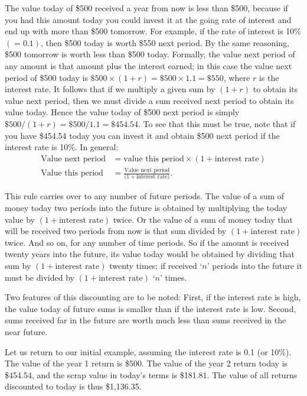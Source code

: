 The value today of \$500 received a year from now is less than \$500,
because if you had this amount today you could invest it at the going rate
of interest and end up with more than \$500 tomorrow. For example, if the
rate of interest is 10\% $(= 0.1)$, then \$500 today is worth \$550 next
period. By the same reasoning, \$500 tomorrow is worth less than \$500
today.  Formally, the value next period of any amount is that amount plus
the interest earned; in this case the value next period of \$500 today is 
$\$500\times (1+r)=\$500\times 1.1=\$550$, where $r$ is the interest rate. It
follows that if we multiply a given sum by $(1+r)$ to obtain its value next
period, then we must divide a sum received next period to obtain its value
today. Hence the value today of \$500 next period is simply 
$\$500/(1+r)=\$500/1.1=\$454.54$. To see that this must be true, note that if
you have \$454.54 today you can invest it and obtain \$500 next period if
the interest rate is 10\%. In general:
\begin{align*}
\text{Value next period} &=\text{value this period}\times (1+\text{interest rate}) \\
\text{Value this period } &= \frac{\text{Value next period}}{(1+\text{interest rate)}}.
\end{align*}

This rule carries over to any number of future periods. The value of a sum
of money today two periods into the future is obtained by multiplying the
today value by $(1+\text{interest rate})$ twice. Or the value of a sum of money
today that will be received two periods from now is that sum divided by 
$(1+\text{interest rate})$ twice. And so on, for any number of time periods. So if the
amount is received twenty years into the future, its value today would be
obtained by dividing that sum by $(1+\text{interest rate})$ twenty times; if
received `$n$' periods into the future it must be divided by 
$(1+\text{interest rate})$ `$n$' times.

\newhtmlpage

Two features of this discounting are to be noted: First, if the interest
rate is high, the value today of future sums is smaller than if the interest
rate is low. Second, sums received far in the future are worth much less
than sums received in the near future.

Let us return to our initial example, assuming the interest rate is 0.1 (or
10\%). The value of the year 1 return is \$500. The value of the year 2
return today is \$454.54, and the scrap value in today's terms is \$181.81.
The value of all returns discounted to today is thus \$1,136.35. 

